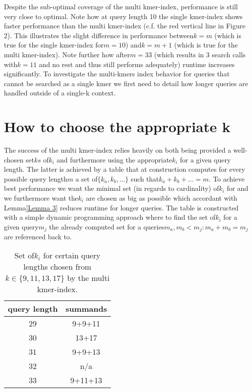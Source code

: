 Despite the sub-optimal coverage of the multi kmer-index, performance
is still very close to optimal. Note how at query length 10 the single
kmer-index shows faster performance than the multi kmer-index (c.f.
the red vertical line in Figure 2). This illustrates the slight difference
in performance between$k=m$ (which is true for the single kmer-index
for$m=10$) and$k=m+1$ (which is true for the multi kmer-index).
Note further how after$m=33$ (which results in 3 search calls with$k=11$
and no rest and thus still performs adequately) runtime increases
significantly. To investigate the multi-kmers index behavior for queries
that cannot be searched as a single kmer we first need to detail how
longer queries are handled outside of a single-k context.

\section{\label{section 4.2}How to choose the appropriate k}

The success of the multi kmer-index relies heavily on both being provided
a well-chosen set$ks$ of$k_{i}$ and furthermore using the appropriate$k_{i}$
for a given query length. The latter is achieved by a table that at
construction computes for every possible query length$m$ a set of$\{k_{a},k_{b},...\}$
such that$k_{a}+k_{b}+...=m$. To achieve best performance we want
the minimal set (in regards to cardinality) of$k_{i}$ for and we
furthermore want the$k_{i}$ are chosen as big as possible which accordant
with Lemma\ref{Lemma 3} reduces runtime for longer queries. The table
is constructed with a simple dynamic programming approach where to
find the set of$k_{i}$ for a given query$m_{j}$ the already computed
set for a queries$m_{a},m_{b}<m_{j}:m_{a}+m_{b}=m_{j}$ are referenced
back to.

\begin{table}[H]
\centering{}\caption{Set of$k_{i}$ for certain query lengths chosen from$k\in\{9,11,13,17\}$
by the multi kmer-index.}
\begin{tabular}{cc}
\toprule
query length & summands\tabularnewline
\midrule
\midrule
29 & 9+9+11\tabularnewline
\midrule
30 & 13+17\tabularnewline
\midrule
31 & 9+9+13\tabularnewline
\midrule
32 & n/a\tabularnewline
\midrule
33 & 9+11+13\tabularnewline
\bottomrule
\end{tabular}
\end{table}

